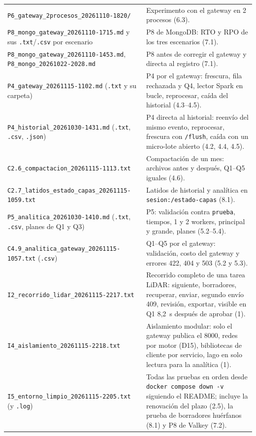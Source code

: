 \documentclass[10pt,letterpaper]{article}
\begin{document}
{\begin{longtable}{@{}p{}p{}@{}}
\texttt{P6\_gateway\_2procesos\_20261110-1820/} & Experimento con el gateway en 2 procesos (6.3). \\
\texttt{P8\_mongo\_gateway\_20261110-1715.md} y sus \texttt{.txt}/\texttt{.csv} por escenario & P8 de MongoDB: RTO y RPO de los tres escenarios (7.1). \\
\texttt{P8\_mongo\_gateway\_20261110-1453.md}, \texttt{P8\_mongo\_20261022-2028.md} & P8 antes de corregir el gateway y directa al registro (7.1). \\
\texttt{P4\_gateway\_20261115-1102.md} (\texttt{.txt} y su carpeta) & P4 por el gateway: frescura, fila rechazada y Q4, lector Spark en bucle, reprocesar, caída del historial (4.3--4.5). \\
\texttt{P4\_historial\_20261030-1431.md} (\texttt{.txt}, \texttt{.csv}, \texttt{.json}) & P4 directa al historial: reenvío del mismo evento, reprocesar, frescura con \texttt{/flush}, caída con un micro-lote abierto (4.2, 4.4, 4.5). \\
\texttt{C2.6\_compactacion\_20261115-1113.txt} & Compactación de un mes: archivos antes y después, Q1--Q5 iguales (4.6). \\
\texttt{C2.7\_latidos\_estado\_capas\_20261115-1059.txt} & Latidos de historial y analítica en \texttt{sesion:/estado-capas} (8.1). \\
\texttt{P5\_analitica\_20261030-1410.md} (\texttt{.txt}, \texttt{.csv}, planes de Q1 y Q3) & P5: validación contra \texttt{prueba}, tiempos, 1 y 2 workers, principal y grande, planes (5.2--5.4). \\
\texttt{C4.9\_analitica\_gateway\_20261115-1057.txt} (\texttt{.csv}) & Q1--Q5 por el gateway: validación, costo del gateway y errores 422, 404 y 503 (5.2 y 5.3). \\
\texttt{I2\_recorrido\_lidar\_20261115-2217.txt} & Recorrido completo de una tarea LiDAR: siguiente, borradores, recuperar, enviar, segundo envío 409, revisión, exportar, visible en Q1 8,2~s después de aprobar (1). \\
\texttt{I4\_aislamiento\_20261115-2218.txt} & Aislamiento modular: solo el gateway publica el 8000, redes por motor (D15), bibliotecas de cliente por servicio, lago en solo lectura para la analítica (1). \\
\texttt{I5\_entorno\_limpio\_20261115-2205.txt} (y \texttt{.log}) & Todas las pruebas en orden desde \texttt{docker compose down -v} siguiendo el README; incluye la renovación del plazo (2.5), la prueba de borradores huérfanos (8.1) y P8 de Valkey (7.2). \\

\end{longtable}}
\end{document}
